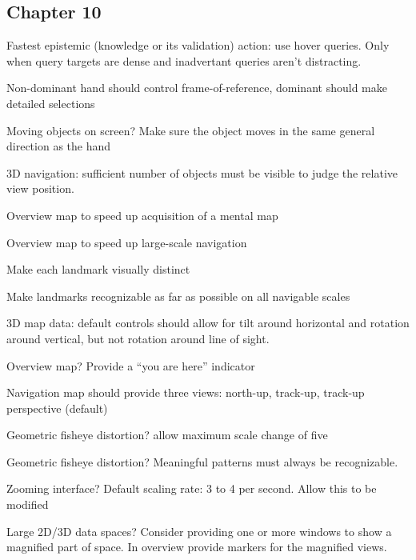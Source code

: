 \subsection{Chapter 10}


\begin{compactenum}

\item Fastest epistemic (knowledge or its validation) action: use hover
    queries. Only when query targets are dense and inadvertant queries aren't
    distracting.

\item Non-dominant hand should control frame-of-reference, dominant should
    make detailed selections

\item Moving objects on screen? Make sure the object moves in the same general
    direction as the hand

\item 3D navigation: sufficient number of objects must be visible to judge the
    relative view position.

\item Overview map to speed up acquisition of a mental map

\item Overview map to speed up large-scale navigation

\item Make each landmark visually distinct

\item Make landmarks recognizable as far as possible on all navigable scales

\item 3D map data: default controls should allow for tilt around horizontal
    and rotation around vertical, but not rotation around line of sight.

\item Overview map? Provide a ``you are here'' indicator

\item Navigation map should provide three views: north-up, track-up, track-up
    perspective (default)

\item Geometric fisheye distortion? allow maximum scale change of five

\item Geometric fisheye distortion? Meaningful patterns must always be
    recognizable.

\item Zooming interface? Default scaling rate: 3 to 4 per second. Allow this to
    be modified

\item  Large 2D/3D data spaces? Consider providing one or more windows to show a
    magnified part of space. In overview provide markers for the magnified
    views.

\end{compactenum}





